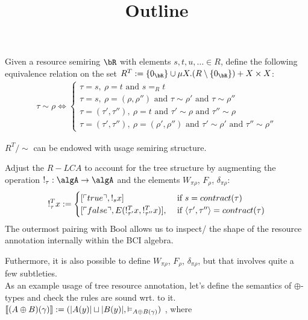 \documentclass[12pt,a4paper]{article}
\title{\vspace{-5em}Outline}
\date{\vspace{-3em}}
\begin{document}
\maketitle

Given a resource semiring $\bR$ with elements $s , t , u , \dots \in R$, define the following equivalence relation on the set $R^T \define \{0_\bR\} \cup \mu X. (R\setminus\{0_\bR\})  + X \times X$:
\begin{gather*}
  \tau \sim \rho \iff 
  \begin{cases}
     \tau = s,\ \rho = t \text{ and } s =_R t \\
     \tau = s,\ \rho = (\rho, \rho'') \text{ and } \tau \sim \rho' \text{ and } \tau \sim \rho''\\
     \tau = (\tau', \tau''),\ \rho = t \text{ and } \tau' \sim \rho \text { and } \tau'' \sim \rho \\
     \tau = (\tau', \tau''),\ \rho = (\rho', \rho'') \text{ and } \tau' \sim \rho' \text { and } \tau'' \sim \rho''      
  \end{cases}
\end{gather*}
\begin{claim}
  $R^T/\sim$ can be endowed with usage semiring structure.
\end{claim}
Adjust the $R-LCA$ to account for the tree structure by augmenting the operation $!_\tau : \algA \to \algA$ and the elements $W_{\pi\rho}$, $F_\rho$, $\delta_{\pi\rho}$:
\begin{gather*}
  !^T_\tau x := 
  \begin{cases}
   [\ulcorner true \urcorner, !_s x]  &\text{ if } s = contract(\tau) \\
   [\ulcorner false \urcorner , E(!^T_{\tau'} x , !^T_{\tau''} x)],  &\text{ if } \langle\tau', \tau''\rangle = contract(\tau)\label{1}
  \end{cases}
\end{gather*}
The outermost pairing with Bool allows us to inspect/ the shape of the resource annotation internally within the BCI algebra.

Futhermore, it is also possible to define $W_{\pi\rho}$, $F_\rho$, $\delta_{\pi\rho}$, but that involves quite a few subtleties.\\

As an example usage of tree resource annotation, let's define the semantics of $\oplus$-types and check the rules are sound wrt. to it.\\
$\llbracket (A \oplus B)(\gamma)\rrbracket := (|A(y)| \sqcup |B(y)|, \vDash_{A\oplus B(\gamma)} )$ , where \\
\end{document}
